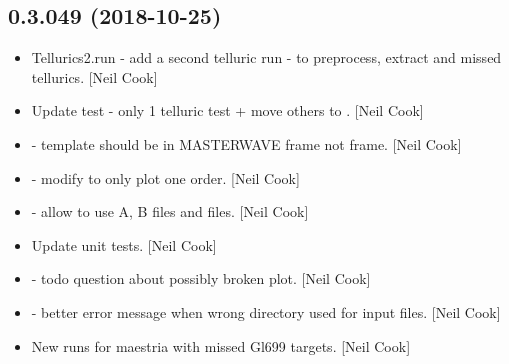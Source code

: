 \documentclass[a4paper,10pt,english]{report}
\begin{document}
\subsection{0.3.049 (2018-10-25)}
\label{\detokenize{misc/changelog:id283}}\begin{itemize}
\item {} 
Tellurics2.run - add a second telluric run - to preprocess, extract
and  missed tellurics. {[}Neil Cook{]}

\item {} 
Update test - only 1 telluric test + move others to . {[}Neil
Cook{]}

\item {} 
 - template should be in MASTERWAVE frame not 
frame. {[}Neil Cook{]}

\item {} 
 - modify  to only plot one
order. {[}Neil Cook{]}

\item {} 
 - allow  to use A, B files
and  files. {[}Neil Cook{]}

\item {} 
Update unit tests. {[}Neil Cook{]}

\item {} 
 - todo question about possibly broken plot. {[}Neil
Cook{]}

\item {} 
 - better error message when wrong directory used for
input files. {[}Neil Cook{]}

\item {} 
New  runs for maestria with missed Gl699 targets. {[}Neil Cook{]}

\end{itemize}
\end{document}
